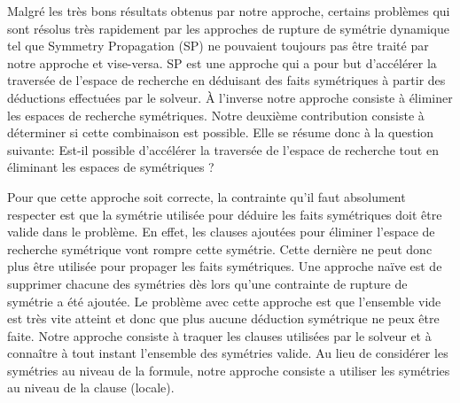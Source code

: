 Malgré les très bons résultats obtenus par notre approche, certains problèmes qui sont résolus très 
rapidement par les approches de rupture de symétrie dynamique tel que  Symmetry Propagation (SP) ne pouvaient toujours pas être traité par notre approche et vise-versa.
SP est une approche qui a pour but d'accélérer la traversée de l'espace de recherche en déduisant des faits symétriques à partir des déductions effectuées par le solveur.
À l'inverse notre approche consiste à éliminer les espaces de recherche 
symétriques. %
Notre deuxième contribution consiste à déterminer si cette combinaison est possible. Elle se résume donc à la question suivante:
Est-il possible d'accélérer la traversée de l'espace de recherche tout en éliminant les espaces de symétriques ?

Pour que cette approche soit correcte, la contrainte qu'il faut absolument respecter est que la symétrie utilisée pour déduire les faits symétriques doit être valide dans le problème. En effet, les clauses ajoutées pour éliminer l'espace de recherche
symétrique vont rompre cette symétrie. Cette dernière ne peut donc plus être utilisée pour propager les faits symétriques.
Une approche naïve est de supprimer chacune des symétries dès lors qu'une contrainte de rupture de symétrie a été ajoutée.
Le problème avec cette approche est que l'ensemble vide est très vite atteint et donc que plus aucune déduction symétrique ne peux être faite. Notre approche consiste à traquer les clauses utilisées par le solveur et à connaître à tout instant l'ensemble des symétries valide. Au lieu de considérer les symétries au niveau de la formule,
notre approche consiste a utiliser les symétries au niveau de la clause (locale).


\vspace{2em}


\begin{table}[!htbp]\footnotesize
	\centering
	\caption{Comparaison du nombre de problèmes résolus par chaque approche.}
	\label{tab:satfr}
\end{table}%


